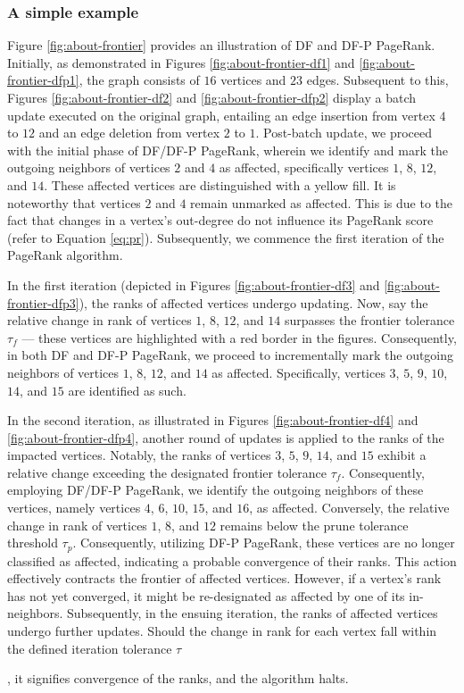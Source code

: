 \subsubsection{A simple example}

Figure \ref{fig:about-frontier} provides an illustration of DF and DF-P PageRank. Initially, as demonstrated in Figures \ref{fig:about-frontier-df1} and \ref{fig:about-frontier-dfp1}, the graph consists of $16$ vertices and $23$ edges. Subsequent to this, Figures \ref{fig:about-frontier-df2} and \ref{fig:about-frontier-dfp2} display a batch update executed on the original graph, entailing an edge insertion from vertex $4$ to $12$ and an edge deletion from vertex $2$ to $1$. Post-batch update, we proceed with the initial phase of DF/DF-P PageRank, wherein we identify and mark the outgoing neighbors of vertices $2$ and $4$ as affected, specifically vertices $1$, $8$, $12$, and $14$. These affected vertices are distinguished with a yellow fill. It is noteworthy that vertices $2$ and $4$ remain unmarked as affected. This is due to the fact that changes in a vertex's out-degree do not influence its PageRank score (refer to Equation \ref{eq:pr}). Subsequently, we commence the first iteration of the PageRank algorithm.

In the first iteration (depicted in Figures \ref{fig:about-frontier-df3} and \ref{fig:about-frontier-dfp3}), the ranks of affected vertices undergo updating. Now, say the relative change in rank of vertices $1$, $8$, $12$, and $14$ surpasses the frontier tolerance $\tau_f$ --- these vertices are highlighted with a red border in the figures. Consequently, in both DF and DF-P PageRank, we proceed to incrementally mark the outgoing neighbors of vertices $1$, $8$, $12$, and $14$ as affected. Specifically, vertices $3$, $5$, $9$, $10$, $14$, and $15$ are identified as such.



In the second iteration, as illustrated in Figures \ref{fig:about-frontier-df4} and \ref{fig:about-frontier-dfp4}, another round of updates is applied to the ranks of the impacted vertices. Notably, the ranks of vertices $3$, $5$, $9$, $14$, and $15$ exhibit a relative change exceeding the designated frontier tolerance $\tau_f$. Consequently, employing DF/DF-P PageRank, we identify the outgoing neighbors of these vertices, namely vertices $4$, $6$, $10$, $15$, and $16$, as affected. Conversely, the relative change in rank of vertices $1$, $8$, and $12$ remains below the prune tolerance threshold $\tau_p$. Consequently, utilizing DF-P PageRank, these vertices are no longer classified as affected, indicating a probable convergence of their ranks. This action effectively contracts the frontier of affected vertices. However, if a vertex's rank has not yet converged, it might be re-designated as affected by one of its in-neighbors. Subsequently, in the ensuing iteration, the ranks of affected vertices undergo further updates. Should the change in rank for each vertex fall within the defined iteration tolerance $\tau$, it signifies convergence of the ranks, and the algorithm halts.

